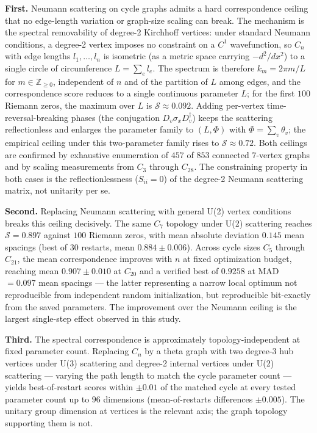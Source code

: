 \documentclass[cntp]{ipart}
\theoremstyle{plain}
\theoremstyle{remark}
\begin{document}
\smallskip\noindent\textbf{First.} Neumann scattering on cycle graphs admits a hard correspondence ceiling that no edge-length variation or graph-size scaling can break. The mechanism is the spectral removability of degree-2 Kirchhoff vertices: under standard Neumann conditions, a degree-2 vertex imposes no constraint on a $C^1$ wavefunction, so $C_n$ with edge lengths $l_1, \ldots, l_n$ is isometric (as a metric space carrying $-d^2/dx^2$) to a single circle of circumference $L = \sum_e l_e$. The spectrum is therefore $k_m = 2\pi m / L$ for $m \in \mathbb{Z}_{\geq 0}$, independent of $n$ and of the partition of $L$ among edges, and the correspondence score reduces to a single continuous parameter $L$; for the first $100$ Riemann zeros, the maximum over $L$ is $\mathcal{S} \approx 0.092$. Adding per-vertex time-reversal-breaking phases (the conjugation $D_v \sigma_x D_v^\dagger$) keeps the scattering reflectionless and enlarges the parameter family to $(L, \Phi)$ with $\Phi = \sum_v \theta_v$; the empirical ceiling under this two-parameter family rises to $\mathcal{S} \approx 0.72$. Both ceilings are confirmed by exhaustive enumeration of $457$ of $853$ connected $7$-vertex graphs and by scaling measurements from $C_3$ through $C_{28}$. The constraining property in both cases is the reflectionlessness ($S_{ii} = 0$) of the degree-2 Neumann scattering matrix, not unitarity per se.

\smallskip\noindent\textbf{Second.} Replacing Neumann scattering with general U(2) vertex conditions breaks this ceiling decisively. The same $C_7$ topology under U(2) scattering reaches $\mathcal{S} = 0.897$ against $100$ Riemann zeros, with mean absolute deviation $0.145$ mean spacings (best of $30$ restarts, mean $0.884 \pm 0.006$). Across cycle sizes $C_5$ through $C_{21}$, the mean correspondence improves with $n$ at fixed optimization budget, reaching mean $0.907 \pm 0.010$ at $C_{20}$ and a verified best of $0.9258$ at MAD $= 0.097$ mean spacings --- the latter representing a narrow local optimum not reproducible from independent random initialization, but reproducible bit-exactly from the saved parameters. The improvement over the Neumann ceiling is the largest single-step effect observed in this study.

\smallskip\noindent\textbf{Third.} The spectral correspondence is approximately topology-independent at fixed parameter count. Replacing $C_n$ by a theta graph with two degree-3 hub vertices under U(3) scattering and degree-2 internal vertices under U(2) scattering --- varying the path length to match the cycle parameter count --- yields best-of-restart scores within $\pm 0.01$ of the matched cycle at every tested parameter count up to $96$ dimensions (mean-of-restarts differences $\pm 0.005$). The unitary group dimension at vertices is the relevant axis; the graph topology supporting them is not.
\end{document}
